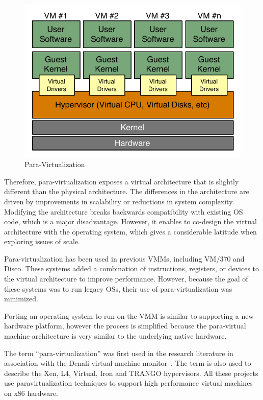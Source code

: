 \begin{figure}[H]
	\center
	\includegraphics[scale=0.75]{intro/para-virtualization}
	\caption{Para-Virtualization}
\end{figure}

Therefore, para-virtualization exposes a virtual architecture that is slightly
different than the physical architecture. The differences in the architecture
are driven by improvements in scalability or reductions in system complexity.
Modifying the architecture breaks backwards compatibility with existing OS
code, which is a major disadvantage. However, it enables to co-design the
virtual architecture with the operating system, which gives a considerable
latitude when exploring issues of scale.

Para-virtualization has been used in previous VMMs, including VM/370 and Disco.
These systems added a combination of instructions, registers, or devices to the
virtual architecture to improve performance. However, because the goal of these
systems was to run legacy OSs, their use of para-virtualization was
minimized.~\cite{denali}

Porting an operating system to run on the VMM is similar to supporting a new
hardware platform, however the process is simplified because the para-virtual
machine architecture is very similar to the underlying native hardware.

The term ``para-virtualization'' was first used in the research literature in
association with the Denali virtual machine monitor~\cite{denali}. The term
is also used to describe the Xen, L4, Virtual, Iron and TRANGO hypervisors. All
these projects use paravirtualization techniques to support high performance
virtual machines on x86 hardware.


